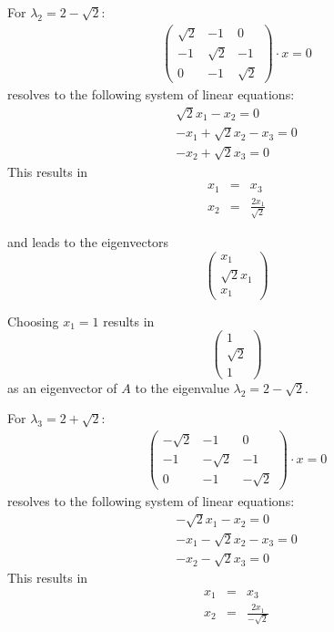 \documentclass{article}
\begin{document}
For $\lambda_2 = 2 - \sqrt{2}$:
\begin{eqnarray}
\left(
\begin{array}{ccc}
\sqrt{2} & -1 & 0 \\
-1 & \sqrt{2} & -1 \\
0 & -1 & \sqrt{2}
\end{array} \right) \cdot x = 0
\end{eqnarray}
resolves to the following system of linear equations:
\begin{eqnarray}
\sqrt{2}x_1-x_2 = 0 \\
-x_1 +\sqrt{2} x_2 -x_3 = 0 \\
-x_2 + \sqrt{2} x_3 = 0
\end{eqnarray}
This results in 
\begin{eqnarray}
x_1 &=& x_3 \\
x_2 &=& \frac{2x_1}{\sqrt{2}}
\end{eqnarray}

and leads to the eigenvectors
\begin{equation}
\left( \begin{array}{c}
x_1 \\ \sqrt{2} x_1 \\ x_1
\end{array} \right)
\end{equation}

Choosing $x_1 = 1$ results in
\begin{equation}
\left( \begin{array}{c}
1 \\ \sqrt{2} \\ 1
\end{array} \right)
\end{equation}
as an eigenvector of $A$ to the eigenvalue $\lambda_2 = 2- \sqrt{2}$.

For $\lambda_3 = 2 + \sqrt{2}$:
\begin{eqnarray}
\left(
\begin{array}{ccc}
-\sqrt{2} & -1 & 0 \\
-1 & -\sqrt{2} & -1 \\
0 & -1 & -\sqrt{2}
\end{array} \right) \cdot x = 0
\end{eqnarray}
resolves to the following system of linear equations:
\begin{eqnarray}
-\sqrt{2}x_1-x_2 = 0 \\
-x_1 -\sqrt{2} x_2 -x_3 = 0 \\
-x_2 - \sqrt{2} x_3 = 0
\end{eqnarray}
This results in 
\begin{eqnarray}
x_1 &=& x_3 \\
x_2 &=& \frac{2x_1}{-\sqrt{2}}
\end{eqnarray}
\end{document}
